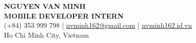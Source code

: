 \begin{center}
    {\fontsize{25}{28}\selectfont\bfseries NGUYEN VAN MINH}\\[4pt]
    {\large\bfseries MOBILE DEVELOPER INTERN}\\[6pt]
    (+84) 353 999 798 \;|\; \href{mailto:nvminh162@gmail.com}{nvminh162@gmail.com} \;|\; \href{https://nvminh162.id.vn}{nvminh162.id.vn}\\[3pt]
    Ho Chi Minh City, Vietnam
    \\ \vspace{-1pt}
\end{center}
